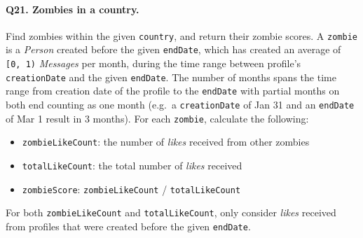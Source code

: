 \paragraph{\textbf{Q21}. Zombies in a country.}
Find zombies within the given \texttt{country}, and return their zombie
scores. A \texttt{zombie} is a \emph{Person} created before the given
\texttt{endDate}, which has created an average of \texttt{{[}0,\ 1)}
\emph{Messages} per month, during the time range between profile's
\texttt{creationDate} and the given \texttt{endDate}. The number of
months spans the time range from creation date of the profile to the
\texttt{endDate} with partial months on both end counting as one month
(e.g.~a \texttt{creationDate} of Jan 31 and an \texttt{endDate} of Mar 1
result in 3 months).
For each \texttt{zombie}, calculate the following:
\begin{itemize}
\tightlist
\item
  \texttt{zombieLikeCount}: the number of \emph{likes} received from
  other zombies
\item
  \texttt{totalLikeCount}: the total number of \emph{likes} received
\item
  \texttt{zombieScore}: \texttt{zombieLikeCount} /
  \texttt{totalLikeCount}
\end{itemize}
For both \texttt{zombieLikeCount} and \texttt{totalLikeCount}, only
consider \emph{likes} received from profiles that were created before
the given \texttt{endDate}.
